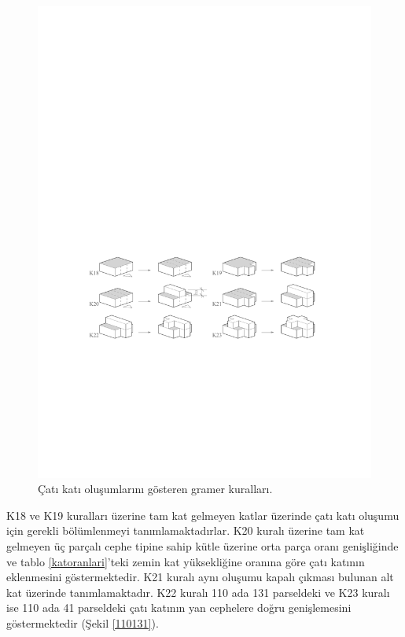 \documentclass[12pt,turkish,a4paperpaper,]{report}
\begin{document}
\begin{figure}
\centering
\includegraphics[width=1\textwidth,height=\textheight]{source/figures/K18-K23.pdf}
\caption{Çatı katı oluşumlarını gösteren gramer kuralları.
\label{K18K23}}
\end{figure}

K18 ve K19 kuralları üzerine tam kat gelmeyen katlar üzerinde çatı katı
oluşumu için gerekli bölümlenmeyi tanımlamaktadırlar. K20 kuralı üzerine
tam kat gelmeyen üç parçalı cephe tipine sahip kütle üzerine orta parça
oranı genişliğinde ve tablo \ref{katoranlari}'teki zemin kat
yüksekliğine oranına göre çatı katının eklenmesini göstermektedir. K21
kuralı aynı oluşumu kapalı çıkması bulunan alt kat üzerinde
tanımlamaktadır. K22 kuralı 110 ada 131 parseldeki ve K23 kuralı ise 110
ada 41 parseldeki çatı katının yan cephelere doğru genişlemesini
göstermektedir (Şekil \ref{110131}).
\end{document}
